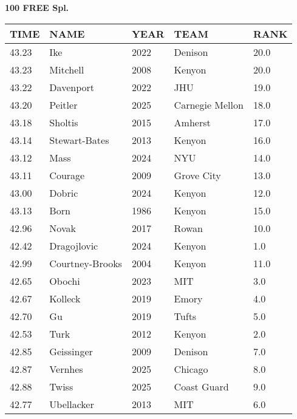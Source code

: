 \begin{center}
\begin{minipage}[t]{0.7\textwidth}
\centering
\textbf{100 FREE Spl.}\\[0.05cm]
\begin{tabular}{@{}p{1.8cm}p{2.8cm}p{1.2cm}p{1.4cm}p{0.8cm}@{}}
\hline
\textbf{TIME} & \textbf{NAME} & \textbf{YEAR} & \textbf{TEAM} & \textbf{RANK} \\
\hline
43.23 & Ike & 2022 & Denison & 20.0 \\
43.23 & Mitchell & 2008 & Kenyon & 20.0 \\
43.22 & Davenport & 2022 & JHU & 19.0 \\
43.20 & Peitler & 2025 & Carnegie Mellon & 18.0 \\
43.18 & Sholtis & 2015 & Amherst & 17.0 \\
43.14 & Stewart-Bates & 2013 & Kenyon & 16.0 \\
43.12 & Mass & 2024 & NYU & 14.0 \\
43.11 & Courage & 2009 & Grove City & 13.0 \\
43.00 & Dobric & 2024 & Kenyon & 12.0 \\
43.13 & Born & 1986 & Kenyon & 15.0 \\
42.96 & Novak & 2017 & Rowan & 10.0 \\
42.42 & Dragojlovic & 2024 & Kenyon & 1.0 \\
42.99 & Courtney-Brooks & 2004 & Kenyon & 11.0 \\
42.65 & Obochi & 2023 & MIT & 3.0 \\
42.67 & Kolleck & 2019 & Emory & 4.0 \\
42.70 & Gu & 2019 & Tufts & 5.0 \\
42.53 & Turk & 2012 & Kenyon & 2.0 \\
42.85 & Geissinger & 2009 & Denison & 7.0 \\
42.87 & Vernhes & 2025 & Chicago & 8.0 \\
42.88 & Twiss & 2025 & Coast Guard & 9.0 \\
42.77 & Ubellacker & 2013 & MIT & 6.0 \\
\hline
\end{tabular}
\end{minipage}
\end{center}

\vspace{0.4cm}

